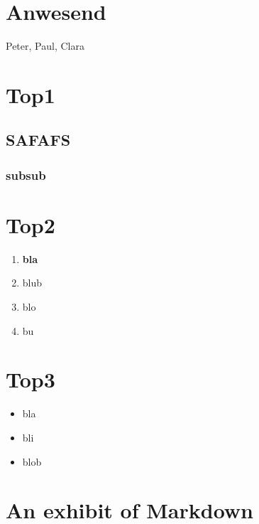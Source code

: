 \hypertarget{anwesend}{%
\section{Anwesend}\label{anwesend}}

Peter, Paul, Clara

\tableofcontents

\hypertarget{top1}{%
\section{Top1}\label{top1}}

\Blindtext[1][3]

\hypertarget{safafs}{%
\subsection{SAFAFS}\label{safafs}}

\Blindtext[2][7]

\hypertarget{subsub}{%
\subsubsection{subsub}\label{subsub}}

\Blindtext[2][5]

\hypertarget{top2}{%
\section{Top2}\label{top2}}

\begin{enumerate}
\def\labelenumi{\arabic{enumi}.}
\item
  \textbf{bla} \Blindtext[1][5]
\item
  blub
\item
  blo
\item
  bu
\end{enumerate}

\hypertarget{top3}{%
\section{Top3}\label{top3}}

\begin{itemize}
\item
  bla
\item
  bli
\item
  blob
\end{itemize}

\hypertarget{an-exhibit-of-markdown}{%
\section{An exhibit of Markdown}\label{an-exhibit-of-markdown}}

